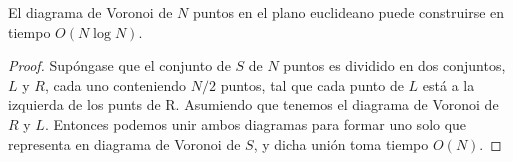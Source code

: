 \begin{theorem}
El diagrama de Voronoi de $N$ puntos en el plano euclideano puede construirse en tiempo $O(N \log N)$.
\end{theorem}
\begin{proof}
Supóngase que el conjunto de $S$ de $N$ puntos es dividido en dos conjuntos, $L$ y $R$, cada uno conteniendo $N/2$ puntos, tal que cada punto de $L$ está a la izquierda de los punts de R. Asumiendo que tenemos el diagrama de Voronoi de $R$ y $L$. Entonces podemos unir ambos diagramas para formar uno solo que representa en diagrama de Voronoi de $S$, y dicha unión toma tiempo $O(N)$.
\end{proof}






















